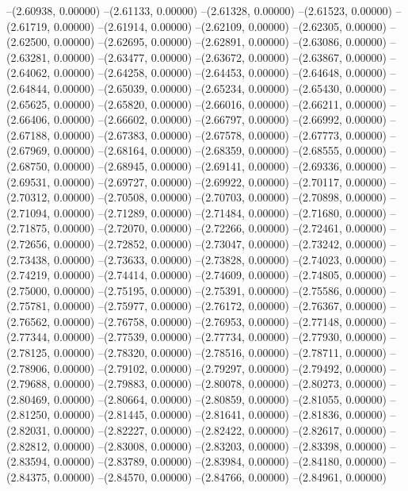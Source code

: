 --(2.60938, 0.00000)
--(2.61133, 0.00000)
--(2.61328, 0.00000)
--(2.61523, 0.00000)
--(2.61719, 0.00000)
--(2.61914, 0.00000)
--(2.62109, 0.00000)
--(2.62305, 0.00000)
--(2.62500, 0.00000)
--(2.62695, 0.00000)
--(2.62891, 0.00000)
--(2.63086, 0.00000)
--(2.63281, 0.00000)
--(2.63477, 0.00000)
--(2.63672, 0.00000)
--(2.63867, 0.00000)
--(2.64062, 0.00000)
--(2.64258, 0.00000)
--(2.64453, 0.00000)
--(2.64648, 0.00000)
--(2.64844, 0.00000)
--(2.65039, 0.00000)
--(2.65234, 0.00000)
--(2.65430, 0.00000)
--(2.65625, 0.00000)
--(2.65820, 0.00000)
--(2.66016, 0.00000)
--(2.66211, 0.00000)
--(2.66406, 0.00000)
--(2.66602, 0.00000)
--(2.66797, 0.00000)
--(2.66992, 0.00000)
--(2.67188, 0.00000)
--(2.67383, 0.00000)
--(2.67578, 0.00000)
--(2.67773, 0.00000)
--(2.67969, 0.00000)
--(2.68164, 0.00000)
--(2.68359, 0.00000)
--(2.68555, 0.00000)
--(2.68750, 0.00000)
--(2.68945, 0.00000)
--(2.69141, 0.00000)
--(2.69336, 0.00000)
--(2.69531, 0.00000)
--(2.69727, 0.00000)
--(2.69922, 0.00000)
--(2.70117, 0.00000)
--(2.70312, 0.00000)
--(2.70508, 0.00000)
--(2.70703, 0.00000)
--(2.70898, 0.00000)
--(2.71094, 0.00000)
--(2.71289, 0.00000)
--(2.71484, 0.00000)
--(2.71680, 0.00000)
--(2.71875, 0.00000)
--(2.72070, 0.00000)
--(2.72266, 0.00000)
--(2.72461, 0.00000)
--(2.72656, 0.00000)
--(2.72852, 0.00000)
--(2.73047, 0.00000)
--(2.73242, 0.00000)
--(2.73438, 0.00000)
--(2.73633, 0.00000)
--(2.73828, 0.00000)
--(2.74023, 0.00000)
--(2.74219, 0.00000)
--(2.74414, 0.00000)
--(2.74609, 0.00000)
--(2.74805, 0.00000)
--(2.75000, 0.00000)
--(2.75195, 0.00000)
--(2.75391, 0.00000)
--(2.75586, 0.00000)
--(2.75781, 0.00000)
--(2.75977, 0.00000)
--(2.76172, 0.00000)
--(2.76367, 0.00000)
--(2.76562, 0.00000)
--(2.76758, 0.00000)
--(2.76953, 0.00000)
--(2.77148, 0.00000)
--(2.77344, 0.00000)
--(2.77539, 0.00000)
--(2.77734, 0.00000)
--(2.77930, 0.00000)
--(2.78125, 0.00000)
--(2.78320, 0.00000)
--(2.78516, 0.00000)
--(2.78711, 0.00000)
--(2.78906, 0.00000)
--(2.79102, 0.00000)
--(2.79297, 0.00000)
--(2.79492, 0.00000)
--(2.79688, 0.00000)
--(2.79883, 0.00000)
--(2.80078, 0.00000)
--(2.80273, 0.00000)
--(2.80469, 0.00000)
--(2.80664, 0.00000)
--(2.80859, 0.00000)
--(2.81055, 0.00000)
--(2.81250, 0.00000)
--(2.81445, 0.00000)
--(2.81641, 0.00000)
--(2.81836, 0.00000)
--(2.82031, 0.00000)
--(2.82227, 0.00000)
--(2.82422, 0.00000)
--(2.82617, 0.00000)
--(2.82812, 0.00000)
--(2.83008, 0.00000)
--(2.83203, 0.00000)
--(2.83398, 0.00000)
--(2.83594, 0.00000)
--(2.83789, 0.00000)
--(2.83984, 0.00000)
--(2.84180, 0.00000)
--(2.84375, 0.00000)
--(2.84570, 0.00000)
--(2.84766, 0.00000)
--(2.84961, 0.00000)
